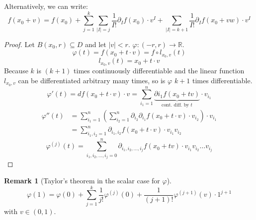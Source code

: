 \documentclass[a4paper,landscape,twocolumn]{article}
\theoremstyle{definition}
\newtheorem{rem}{Remark}
\newcommand\abs[1]{\left|#1\right|}
\begin{document}
Alternatively, we can write:
\[
  f(x_0 + v)
  = f(x_0) + \sum_{j=1}^k \sum_{\abs{I} = j} \frac{1}{I!} \partial_I f(x_0) \cdot v^I
  + \sum_{\abs{I}=k+1} \frac{1}{I!} \partial_I f(x_0 + vw) \cdot v^I
\]

\begin{proof}
  Let $B(x_0, r) \subseteq D$ and let $\abs{v} < r$. $\varphi: (-r, r) \to \mathbb R$.
  \[ \varphi(t) = f(x_0 + t \cdot v) = f \circ l_{x_0,v}(t) \]
  \[ l_{x_0,v}(t) = x_0 + t \cdot v \]
  Because $k$ is $(k+1)$ times continuously differentiable and the linear function
  $l_{x_0,v}$ can be differentiated arbitrary many times, so is $\varphi$ $k+1$ times differentiable.
  \[ \varphi'(t) = df(x_0 + t \cdot v) \cdot v = \sum_{i_1=1}^n \underbrace{\partial i_1 f(x_0 + tv)}_{\text{cont. diff. by $t$}} \cdot v_{i_1} \]
  \begin{align*}
    \varphi''(t) &= \sum_{i_1=1}^n \left(\sum_{i_2=1}^n \partial_{i_2} \partial_{i_1} f(x_0 + t \cdot v) \cdot v_{i_2}\right) \cdot v_{i_1} \\
    &= \sum_{i_1,i_2=1}^n \partial_{i_1,i_2} f(x_0 + t \cdot v) \cdot v_{i_1} v_{i_2}
  \end{align*}
  \[ \varphi^{(j)}(t) = \sum_{i_1,i_2,\ldots,i_j=0}^n \partial_{i_1,i_2,\ldots,i_j} f(x_0 + t v) \cdot v_{i_1} v_{i_2} \ldots v_{i_j} \]
\end{proof}

\begin{rem}[Taylor's theorem in the scalar case for $\varphi$]
  \[ \varphi(1) = \varphi(0) + \sum_{j=1}^k \frac{1}{j!} \varphi^{(j)}(0) + \frac{1}{(j+1)!} \varphi^{(j+1)}(v) \cdot 1^{j+1} \]
  with $v \in (0,1)$.
\end{rem}
\end{document}
